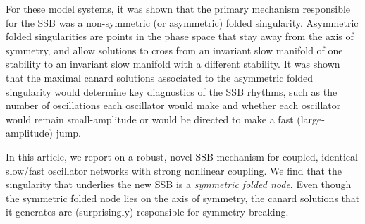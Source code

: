 \documentclass[10pt,onecolumn]{article}
\theoremstyle{plain}
\begin{document}
For these model systems, it was shown that the primary mechanism responsible for the SSB was a non-symmetric (or asymmetric) folded singularity. Asymmetric folded singularities are points in the phase space that stay away from the axis of symmetry, and allow solutions to cross from an invariant slow manifold of one stability to an invariant slow manifold with a different stability. It was shown that the maximal canard solutions associated to the asymmetric folded singularity would determine key diagnostics of the SSB rhythms, such as the number of oscillations each oscillator would make and whether each oscillator would remain small-amplitude or would be directed to make a fast (large-amplitude) jump. 

In this article, we report on a robust, novel SSB mechanism for coupled, identical slow/fast oscillator networks with strong nonlinear coupling. We find that the singularity that underlies the new SSB is a {\em symmetric folded node}. 
Even though the symmetric folded node lies on the axis of symmetry, the canard solutions that it generates are (surprisingly) responsible for symmetry-breaking. 
\end{document}
